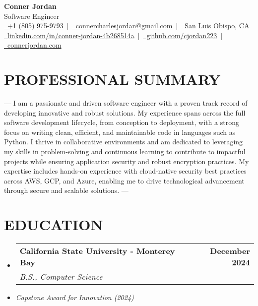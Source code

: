 \documentclass[letterpaper,10pt]{article}
\makeatletter
\newcommand{\resumeSubHeadingListStart}{\begin{itemize}[leftmargin=0in,label={}]}
\newcommand{\resumeSubHeadingListEnd}{\end{itemize}}
\newcommand{\resumeSubheading}[4]{%
  \vspace{-2pt}\item
  \begin{tabular*}{\textwidth}[t]{l@{\extracolsep{\fill}}r}
    \textbf{\large #1} & \textbf{\small #2} \\
    \textit{\large #3} & \textit{\small #4} \\
  \end{tabular*}\vspace{-2pt}
}
\makeatother
\begin{document}
\begin{center}
  {\Huge \textbf{Conner Jordan}}\\[0pt]  %
  {\Large Software Engineer}\\[0pt]  %
  \href{tel:+18059759793}{\faPhone\ +1 (805) 975-9793} \,|\, 
  \href{mailto:connercharlesjordan@gmail.com}{\faEnvelope\ connercharlesjordan@gmail.com} \,|\, 
  \faMapMarker\ San Luis Obispo, CA \\[-2pt]  %
  \href{https://www.linkedin.com/in/conner-jordan-4b268514a/}{\faLinkedin\ linkedin.com/in/conner-jordan-4b268514a}
  \,|\, \href{https://github.com/cjordan223}{\faGithub\ github.com/cjordan223}
  \,|\, \href{https://connerjordan.com/}{\faGlobe\ connerjordan.com}
\end{center}

\vspace{4pt}  %

\section{PROFESSIONAL SUMMARY}
---
I am a passionate and driven software engineer with a proven track record of developing innovative and robust solutions. My experience spans across the full software development lifecycle, from conception to deployment, with a strong focus on writing clean, efficient, and maintainable code in languages such as Python. I thrive in collaborative environments and am dedicated to leveraging my skills in problem-solving and continuous learning to contribute to impactful projects while ensuring application security and robust encryption practices. My expertise includes hands-on experience with cloud-native security best practices across AWS, GCP, and Azure, enabling me to drive technological advancement through secure and scalable solutions.
---
\vspace{6pt}  %

\section{EDUCATION}
\vspace{8pt}  %
\resumeSubHeadingListStart
  \resumeSubheading
    {California State University - Monterey Bay}{December 2024}
    {B.S., Computer Science}{}
  \item \small{\textit{Capstone Award for Innovation (2024)}}
\resumeSubHeadingListEnd
\vspace{6pt}  %
\end{document}
